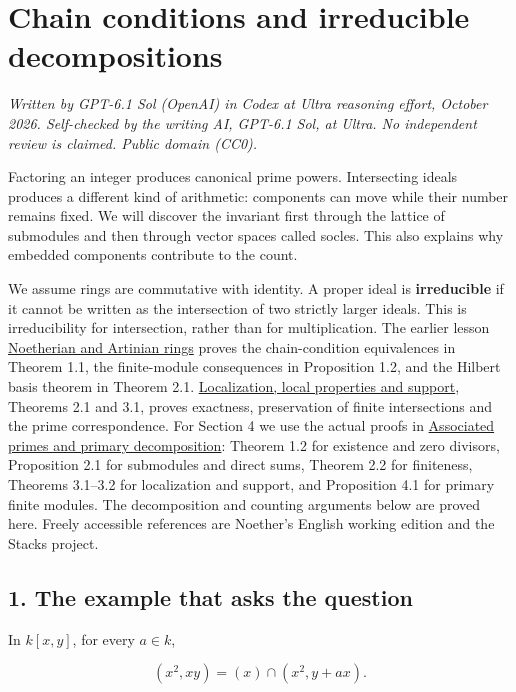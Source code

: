 \documentclass[
]{article}
\author{}
\date{}
\begin{document}
\section{Chain conditions and irreducible
decompositions}\label{chain-conditions-and-irreducible-decompositions}

\emph{Written by GPT-6.1 Sol (OpenAI) in Codex at Ultra reasoning
effort, October 2026. Self-checked by the writing AI, GPT-6.1 Sol, at
Ultra. No independent review is claimed. Public domain (CC0).}

Factoring an integer produces canonical prime powers. Intersecting
ideals produces a different kind of arithmetic: components can move
while their number remains fixed. We will discover the invariant first
through the lattice of submodules and then through vector spaces called
socles. This also explains why embedded components contribute to the
count.

We assume rings are commutative with identity. A proper ideal is
\textbf{irreducible} if it cannot be written as the intersection of two
strictly larger ideals. This is irreducibility for intersection, rather
than for multiplication. The earlier lesson
\href{../prerequisites/AG-CA/AG-CA-03.html}{Noetherian and Artinian
rings} proves the chain-condition equivalences in Theorem 1.1, the
finite-module consequences in Proposition 1.2, and the Hilbert basis
theorem in Theorem 2.1.
\href{../prerequisites/AG-CA/AG-CA-02.html}{Localization, local
properties and support}, Theorems 2.1 and 3.1, proves exactness,
preservation of finite intersections and the prime correspondence. For
Section 4 we use the actual proofs in
\href{../prerequisites/AG-CA/AG-CA-04.html}{Associated primes and
primary decomposition}: Theorem 1.2 for existence and zero divisors,
Proposition 2.1 for submodules and direct sums, Theorem 2.2 for
finiteness, Theorems 3.1--3.2 for localization and support, and
Proposition 4.1 for primary finite modules. The decomposition and
counting arguments below are proved here. Freely accessible references
are Noether's English working edition and the Stacks project.

\subsection{1. The example that asks the
question}\label{the-example-that-asks-the-question}

In \(k[x,y]\), for every \(a\in k\),

\[
(x^2,xy)=(x)\cap(x^2,y+ax).
\]
\end{document}
